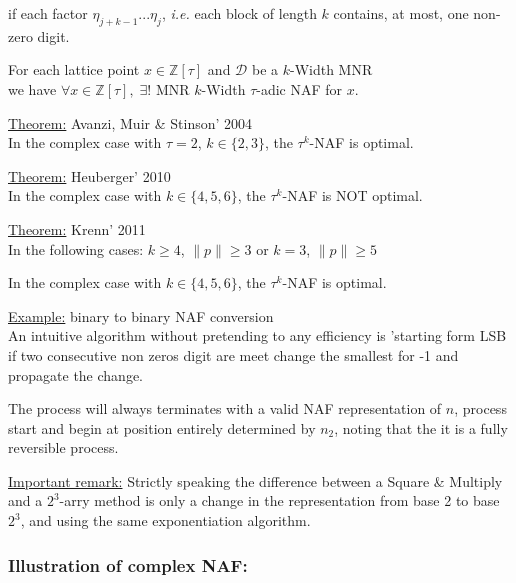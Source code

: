 \begin{itemize}
if each factor $\eta_{j+k-1}...\eta_{j}$, \textit{i.e.} each block of length $k$
contains, at most, one non-zero digit.\\
\vspace{3mm}

\begin{mythm} 
	For each lattice point  $x \in \mathbb{Z}[\tau]$ 
	and  $\mathcal{D}$ be a $k$-Width MNR\\
	we have $\forall x \in \mathbb{Z}[\tau], \; \exists ! $ 
	MNR $k$-Width $\tau$-adic NAF for $x	$.
\end{mythm}

\vspace{5mm}		
		\underline{Theorem:} Avanzi, Muir \& Stinson' 2004\\
		In the complex case with $\tau = 2$, $k \in \{2, 3\}$,
		the $\tau^k$-NAF  is optimal.

		\underline{Theorem:} Heuberger' 2010\\
		In the complex case with $k \in \{4,5,6\}$,
		the $\tau^k$-NAF is NOT optimal.


		\underline{Theorem:} Krenn' 2011\\
		In the following cases:
		$k \geq 4$, $\|p\| \geq 3$ or $k = 3  $, $\|p\| \geq 5$ 

		In the complex case with $k \in \{4,5,6\}$,
		the $\tau^k$-NAF is optimal.

	\end{itemize}
		\underline{Example:} binary to binary NAF conversion\\
			 An intuitive algorithm without pretending to any efficiency is
			'starting form LSB if two consecutive non zeros digit are meet
			change the smallest for -1 and propagate the change. 
			
			The process will always terminates with a valid NAF representation of $n$,
			process start and begin at position entirely determined	by ${n_2}$, 
			noting that the it is a fully reversible process.
			   			     
\underline{Important remark:}
Strictly speaking the difference between a Square \&  Multiply and a $2^3$-arry 
method is only a change in the representation from base 2 to base $2^3$, 
and using the same exponentiation algorithm.

		 
\newpage		
\subsubsection{Illustration of complex NAF:}




